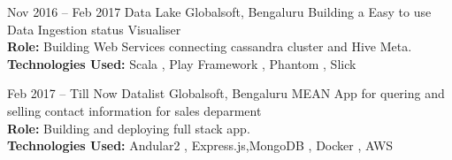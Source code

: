 \documentclass[]{friggeri-cv} %
\begin{document}
\begin{entrylist}
\entry
{Nov 2016 -- Feb 2017}
{Data Lake}
{Globalsoft, Bengaluru}
{Building a Easy to use Data Ingestion status Visualiser \\
\textbf{Role:} Building Web Services connecting cassandra cluster and Hive Meta.\\
\textbf{Technologies Used:} Scala , Play Framework , Phantom , Slick }
\end{entrylist}

\begin{entrylist}
\entry
{Feb 2017 --  Till Now}
{Datalist}
{Globalsoft, Bengaluru}
{MEAN App for quering and selling contact information for sales deparment \\
\textbf{Role:} Building and deploying full stack app.\\
\textbf{Technologies Used:} Andular2 , Express.js,MongoDB , Docker , AWS  }
\end{entrylist}
\end{document}
